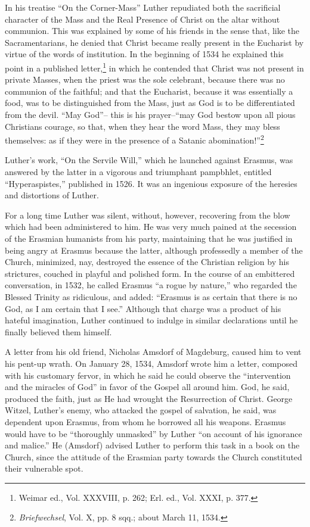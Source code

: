 In his treatise “On the Corner-Mass” Luther repudiated both the
sacrificial character of the Mass and the Real Presence of Christ on
the altar without communion. This was explained by some of his
friends in the sense that, like the Sacramentarians, he denied that
Christ became really present in the Eucharist by virtue of the words
of institution. In the beginning of 1534 he explained this point
in a published letter,\footnote{Weimar ed., Vol. XXXVIII, p. 262; Erl. ed., Vol. XXXI, p. 377.}
 in which he contended that Christ was not
present in private Masses, when the priest was the sole celebrant, because
there was no communion of the faithful; and that the Eucharist,
because it was essentially a food, was to be distinguished from the
Mass, just as God is to be differentiated from the devil. “May God”--
this is his prayer--“may God bestow upon all pious Christians courage,
so that, when they hear the word Mass, they may bless themselves:
as if they were in the presence of a Satanic abomination!”\footnote{\textit{Briefwechsel}, Vol. X, pp. 8 sqq.; about March 11, 1534.}


Luther’s work, “On the Servile Will,” which he launched against
Erasmus, was answered by the latter in a vigorous and triumphant
pampbhlet, entitled “Hyperaspistes,” published in 1526. It was an ingenious
exposure of the heresies and distortions of Luther.

For a long time Luther was silent, without, however, recovering from
the blow which had been administered to him. He was very much pained at
the secession of the Erasmian humanists from his party, maintaining that he
was justified in being angry at Erasmus because the latter, although professedly
a member of the Church, minimized, nay, destroyed the essence of
the Christian religion by his strictures, couched in playful and polished form.
In the course of an embittered conversation, in 1532, he called Erasmus “a
rogue by nature,” who regarded the Blessed Trinity as ridiculous, and added:
“Erasmus is as certain that there is no God, as I am certain that I see.”
Although that charge was a product of his hateful imagination, Luther
continued to indulge in similar declarations until he finally believed
them himself.

A letter from his old friend, Nicholas Amsdorf of Magdeburg, caused him
to vent his pent-up wrath. On January 28, 1534, Amsdorf wrote him a
letter, composed with his customary fervor, in which he said he could
observe the “intervention and the miracles of God” in favor of the Gospel
all around him. God, he said, produced the faith, just as He had wrought
the Resurrection of Christ. George Witzel, Luther’s enemy, who attacked
the gospel of salvation, he said, was dependent upon Erasmus, from whom
he borrowed all his weapons. Erasmus would have to be “thoroughly unmasked”
by Luther “on account of his ignorance and malice.” He (Amsdorf)
advised Luther to perform this task in a book on the Church, since
the attitude of the Erasmian party towards the Church constituted their
vulnerable spot.

